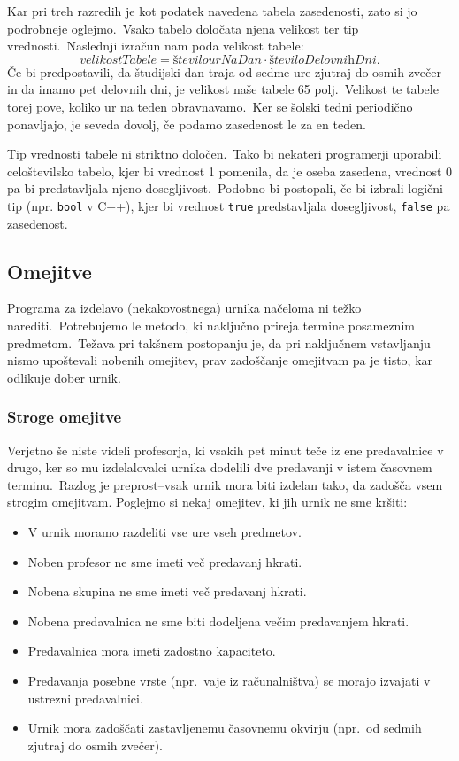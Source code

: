 \documentclass[a4paper,10pt]{article}
\begin{document}
\noindent Kar pri treh razredih je kot podatek navedena tabela zasedenosti, zato si jo podrobneje
oglejmo.\ Vsako tabelo določata njena velikost ter tip vrednosti.\ Naslednji izračun nam
poda velikost tabele:
\[ \textit{velikostTabele} = \textit{številourNaDan} \cdot \textit{številoDelovnihDni}. \]
Če bi predpostavili, da študijski dan traja od sedme ure zjutraj do osmih zvečer in da
imamo pet delovnih dni, je velikost naše tabele 65 polj.\ Velikost te tabele torej pove,
koliko ur na teden obravnavamo.\ Ker se šolski tedni periodično ponavljajo, je seveda
dovolj, če podamo zasedenost le za en teden.

Tip vrednosti tabele ni striktno določen.\ Tako bi nekateri programerji uporabili
celoštevilsko tabelo, kjer bi vrednost 1 pomenila, da je oseba zasedena, vrednost 0
pa bi predstavljala njeno dosegljivost.\ Podobno bi postopali, če bi izbrali logični
tip (npr. \texttt{bool} v C++), kjer bi vrednost \texttt{true} predstavljala
dosegljivost, \texttt{false} pa zasedenost.

\subsection{Omejitve}

Programa za izdelavo (nekakovostnega) urnika načeloma ni težko narediti.\ Potrebujemo
le metodo, ki naključno prireja termine posameznim predmetom.\ Težava pri takšnem postopanju
je, da pri naključnem vstavljanju nismo upoštevali nobenih omejitev, prav zadoščanje omejitvam
pa je tisto, kar odlikuje dober urnik.

\subsubsection{Stroge omejitve}

Verjetno še niste videli profesorja, ki vsakih pet minut teče iz ene predavalnice v drugo,
ker so mu izdelalovalci urnika dodelili dve predavanji v istem časovnem terminu.\ Razlog
je preprost--vsak urnik mora biti izdelan tako, da zadošča vsem strogim omejitvam.
Poglejmo si nekaj omejitev, ki jih urnik ne sme kršiti:

\begin{itemize}
   \item V urnik moramo razdeliti vse ure vseh predmetov.
   \item Noben profesor ne sme imeti več predavanj hkrati.
   \item Nobena skupina ne sme imeti več predavanj hkrati.
   \item Nobena predavalnica ne sme biti dodeljena večim predavanjem hkrati.
   \item Predavalnica mora imeti zadostno kapaciteto.
   \item Predavanja posebne vrste (npr.\ vaje iz računalništva) se morajo izvajati v ustrezni predavalnici.
   \item Urnik mora zadoščati zastavljenemu časovnemu okvirju (npr.\ od sedmih zjutraj do osmih zvečer).
\end{itemize}
\end{document}
